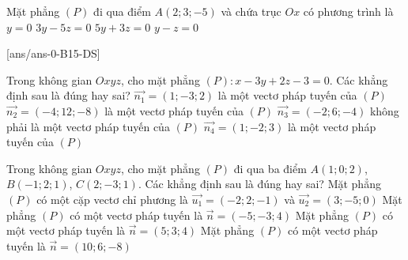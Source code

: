 \begin{ex}%
	Mặt phẳng $(P)$ đi qua điểm $A(2;3;-5)$ và chứa trục $Ox$ có phương trình là
	\choice 
	{$y = 0$}
	{$3y - 5z = 0$}
	{\True $5y + 3z = 0$}
	{$y - z = 0$}
\end{ex}


\cauds
{}[ans/ans-0-B15-DS]

\begin{ex}%
	Trong không gian $Oxyz$, cho mặt phẳng $(P)\colon x-3y+2z-3=0$. Các khẳng định sau là đúng hay sai?
	\choiceTF
	{\True $\vec{n_1}=(1;-3;2)$ là một vectơ pháp tuyến của $(P)$}
	{\True $\vec{n_2}=(-4;12;-8)$ là một vectơ pháp tuyến của $(P)$}
	{$\vec{n_3}=(-2;6;-4)$ không phải là một vectơ pháp tuyến của $(P)$}
	{$\vec{n_4}=(1;-2;3)$ là một vectơ pháp tuyến của $(P)$}
\end{ex}
\begin{ex}%
	Trong không gian $Oxyz$, cho mặt phẳng $(P)$ đi qua ba điểm $A(1;0;2)$, $B(-1;2;1)$, $C(2;-3;1)$. Các khẳng định sau là đúng hay sai?
	\choiceTF
	{\True Mặt phẳng $(P)$ có một cặp vectơ chỉ phương là $\vec{u_1}=(-2;2;-1)$ và $\vec{u_2}=(3;-5;0)$}
	{\True Mặt phẳng $(P)$ có một vectơ pháp tuyến là $\vec{n}=(-5;-3;4)$}
	{Mặt phẳng $(P)$ có một vectơ pháp tuyến là $\vec{n}=(5;3;4)$}
	{\True Mặt phẳng $(P)$ có một vectơ pháp tuyến là $\vec{n}=(10;6;-8)$}
\end{ex}



